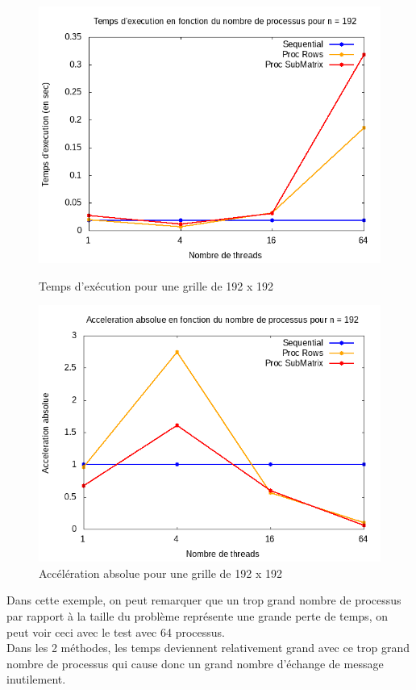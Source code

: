 \documentclass[10pt,a4paper]{article}
\begin{document}
\begin{figure}[h]
  \centering
  \begin{minipage}[b]{0.49\textwidth}
	\includegraphics[width=\textwidth]{./Time/size_192_time.png}
    \caption{Temps d'exécution pour une grille de 192 x 192}
  \end{minipage}
  \hfill
  \begin{minipage}[b]{0.49\textwidth}
    \includegraphics[width=\textwidth]{./Time/size_192_acceleration.png}
    \caption{Accélération absolue pour une grille de 192 x 192}
  \end{minipage}
\end{figure}
Dans cette exemple, on peut remarquer que un trop grand nombre de processus par rapport à la taille du problème représente une grande perte de temps, on peut voir ceci avec le test avec 64 processus. \\
Dans les 2 méthodes, les temps deviennent relativement grand avec ce trop grand nombre de processus qui cause donc un grand nombre d'échange de message inutilement.\\
\end{document}
